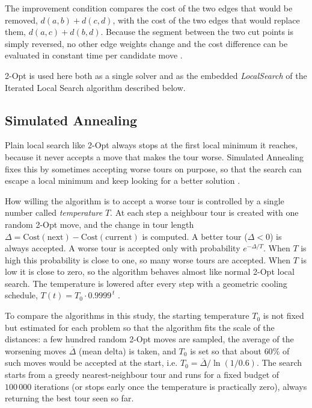 The improvement condition compares the cost of the two edges that would be removed, \( d(a,b) + d(c,d) \), with the cost of the two edges that would replace them, \( d(a,c) + d(b,d) \).
Because the segment between the two cut points is simply reversed, no other edge weights change and the cost difference can be evaluated in constant time per candidate move \cite{regoLocalSearchMetaheuristics}.

2-Opt is used here both as a single solver and as the embedded \textit{LocalSearch} of the Iterated Local Search algorithm described below.





\subsection{Simulated Annealing}
Plain local search like 2-Opt always stops at the first local minimum it reaches, because it never accepts a move that makes the tour worse.
Simulated Annealing fixes this by sometimes accepting worse tours on purpose, so that the search can escape a local minimum and keep looking for a better solution \cite{Delahaye2019}.

How willing the algorithm is to accept a worse tour is controlled by a single number called \textit{temperature} \( T \).
At each step a neighbour tour is created with one random 2-Opt move, and the change in tour length \( \Delta = \text{Cost}(\text{next}) - \text{Cost}(\text{current}) \) is computed.
A better tour (\( \Delta < 0 \)) is always accepted.
A worse tour is accepted only with probability \( e^{-\Delta / T} \).
When \( T \) is high this probability is close to one, so many worse tours are accepted. When \( T \) is low it is close to zero, so the algorithm behaves almost like normal 2-Opt local search.
The temperature is lowered after every step with a geometric cooling schedule, \( T(t) = T_0 \cdot 0.9999^{\,t} \) \cite{Delahaye2019}.

To compare the algorithms in this study, the starting temperature \( T_0 \) is not fixed but estimated for each problem so that the algorithm fits the scale of the distances:
a few hundred random 2-Opt moves are sampled, the average of the worsening moves \( \overline{\Delta} \) (mean delta) is taken, and \( T_0 \) is set so that about \( 60\% \) of such moves would be accepted at the start, i.e. \( T_0 = \overline{\Delta} / \ln(1 / 0.6) \).
The search starts from a greedy nearest-neighbour tour and runs for a fixed budget of \( 100\,000 \) iterations (or stops early once the temperature is practically zero), always returning the best tour seen so far.

